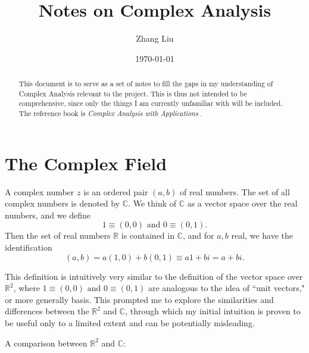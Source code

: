\documentclass[11pt,reqno,oneside,a4paper]{article}
\author{Zhang Liu}
\title{Notes on Complex Analysis}
\date{\today}
\begin{document}
\maketitle
\thispagestyle{fancy}

\begin{abstract}
    This document is to serve as a set of notes to fill the gaps in my understanding of Complex Analysis relevant to the project. This is thus not intended to be comprehensive, since only the things I am currently unfamiliar with will be included. The reference book is \textit{Complex Analysis with Applications} \cite{AG2010a}.
\end{abstract}


\section{The Complex Field} \label{sec:ComplexField}

\begin{defn}
	A complex number $z$ is an ordered pair $(a,b)$ of real numbers. The set of all complex numbers is denoted by $\mathbb{C}$. We think of $\mathbb{C}$ as a vector space over the real numbers, and we define 
	$$1 \equiv (0,0) \text{ and } 0 \equiv (0,1).$$
	Then the set of real numbers $\mathbb{R}$ is contained in $\mathbb{C}$, and for $a,b$ real, we have the identification
	$$(a,b) = a(1,0) + b(0,1) \equiv a1+bi = a + bi.$$
\end{defn}

\par This definition is intuitively very similar to the definition of the vector space over $\mathbb{R}^2$, where $1 \equiv (0,0) \text{ and } 0 \equiv (0,1)$ are analogous to the idea of ``unit vectors," or more generally basis. This prompted me to explore the similarities and differences between the $\mathbb{R}^2$ and $\mathbb{C}$, through which my initial intuition is proven to be useful only to a limited extent and can be potentially misleading. 

A comparison between $\mathbb{R}^2$ and $\mathbb{C}$:
\end{document}
